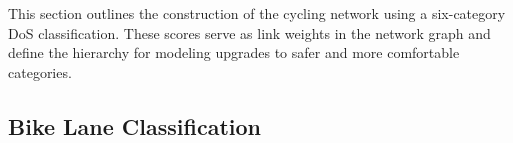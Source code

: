 \documentclass[letterpaper, 10 pt, conference]{ieeeconf}  %
\begin{document}

This section outlines the construction of the cycling network using a six-category DoS classification. These scores serve as link weights in the network graph and define the hierarchy for modeling upgrades to safer and more comfortable categories.


\subsection{Bike Lane Classification}

\end{document}
